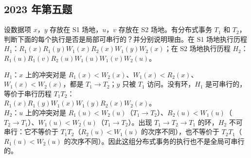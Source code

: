 \documentclass[10pt,a4paper]{article}
\newenvironment{keep}{\par\noindent\begin{minipage}{\linewidth}\setlength{\parskip}{3pt plus 1pt}}{\end{minipage}\par\vspace{2pt}}
\begin{document}
\subsection{2023 年第五题}
\begin{keep}
\begin{prob}[原题]
设数据项 $x$，$y$ 存放在 S1 场地，$u$，$v$ 存放在 S2 场地。有分布式事务 $T_1$ 和 $T_2$，判断下面的每个执行是否是局部可串行的？并分别说明理由。在 S1 场地执行历程 $H_1$：$R_1(x)R_1(y)W_1(x)R_2(x)W_1(y)W_2(x)$；在 S2 场地执行历程 $H_2$：$R_1(u)R_1(v)R_2(u)W_1(u)W_1(v)W_2(u)$。
\end{prob}
\begin{ans}[2023 年第五题]
$H_1$：$x$ 上的冲突对是 $R_1(x)<W_2(x)$、\allowbreak $W_1(x)<R_2(x)$、\allowbreak $W_1(x)<W_2(x)$，都是 $T_1\to T_2$；$y$ 只被 $T_1$ 访问。没有环，$H_1$ 是可串行的，等价于串行历程 $T_1T_2$：\\
\hspace*{2em}$R_1(x)R_1(y)W_1(x)W_1(y)R_2(x)W_2(x)$。\\
$H_2$：$u$ 上的冲突对是 $R_1(u)<W_2(u)$（$T_1\to T_2$）、\allowbreak $R_2(u)<W_1(u)$（$T_2\to T_1$）、\allowbreak $W_1(u)<W_2(u)$（$T_1\to T_2$）。出现 $T_1\to T_2\to T_1$ 的环，$H_2$ 不可串行：它不等价于 $T_1T_2$（$R_2(u)<W_1(u)$ 的次序不同），也不等价于 $T_2T_1$（$R_1(u)<W_2(u)$ 的次序不同）。因此这组分布式事务的执行也不是全局可串行的。
\end{ans}
\end{keep}

\end{document}
